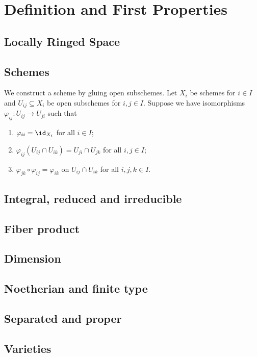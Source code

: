 \section{Definition and First Properties}


\subsection{Locally Ringed Space}


\subsection{Schemes}

    \begin{example}\label{eg:glue_open_subschemes}
        We construct a scheme by gluing open subschemes.
        Let \(X_i\) be schemes for \(i \in I\) and \(U_{ij} \subseteq X_i\) be open subschemes for \(i,j \in I\).
        Suppose we have isomorphisms \(\varphi_{ij} : U_{ij} \to U_{ji}\) such that
        \begin{enumerate}
            \item \(\varphi_{ii} = \id_{X_i}\) for all \(i \in I\);
            \item \(\varphi_{ij}(U_{ij} \cap U_{ik}) = U_{ji} \cap U_{jk}\) for all \(i,j \in I\);
            \item \(\varphi_{jk}\circ \varphi_{ij} = \varphi_{ik}\) on \(U_{ij} \cap U_{ik}\) for all \(i,j,k \in I\).
        \end{enumerate}
        \Yang{}
    \end{example}

\subsection{Integral, reduced and irreducible}

\subsection{Fiber product}

\subsection{Dimension}

\subsection{Noetherian and finite type}

\subsection{Separated and proper}

\subsection{Varieties}